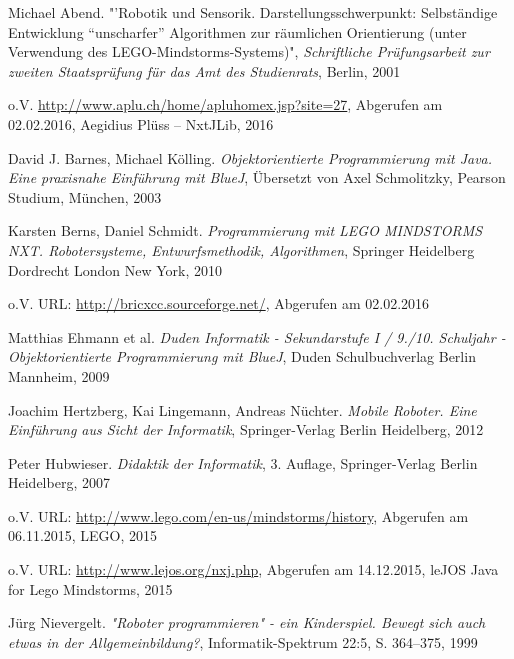 \begin{thebibliography}{ABCDEF}

\renewcommand{\refname}{\normalsize Literaturverzeichnis}

Michael Abend. "'Robotik und Sensorik. Darstellungsschwerpunkt: Selbständige Entwicklung "`unscharfer"' Algorithmen zur räumlichen Orientierung (unter Verwendung des LEGO-Mindstorms-Systems)", \emph{Schriftliche Prüfungsarbeit zur zweiten Staatsprüfung für das Amt des Studienrats}, Berlin, 2001

o.V. \url{http://www.aplu.ch/home/apluhomex.jsp?site=27}, Abgerufen am 02.02.2016, Aegidius Plüss -- NxtJLib, 2016

David J. Barnes, Michael Kölling. \emph{Objektorientierte Programmierung mit Java. Eine praxisnahe Einführung mit BlueJ}, Übersetzt von Axel Schmolitzky, Pearson Studium, München, 2003

Karsten Berns, Daniel Schmidt. \emph{Programmierung mit LEGO MINDSTORMS NXT. Robotersysteme, Entwurfsmethodik, Algorithmen}, Springer Heidelberg Dordrecht London New York, 2010

o.V. URL: \url{http://bricxcc.sourceforge.net/}, Abgerufen am 02.02.2016

Matthias Ehmann et al. \emph{Duden Informatik - Sekundarstufe I / 9./10. Schuljahr - Objektorientierte Programmierung mit BlueJ}, Duden Schulbuchverlag Berlin Mannheim, 2009

Joachim Hertzberg, Kai Lingemann, Andreas Nüchter. \emph{Mobile Roboter. Eine Einführung aus Sicht der Informatik}, Springer-Verlag Berlin Heidelberg, 2012

Peter Hubwieser. \emph{Didaktik der Informatik}, 3. Auflage, Springer-Verlag Berlin Heidelberg, 2007


o.V. URL: \url{http://www.lego.com/en-us/mindstorms/history}, Abgerufen am 06.11.2015, LEGO, 2015

o.V. URL: \url{http://www.lejos.org/nxj.php}, Abgerufen am 14.12.2015, leJOS Java for Lego Mindstorms, 2015

Jürg Nievergelt. \emph{"Roboter programmieren" - ein Kinderspiel. Bewegt sich auch etwas in der Allgemeinbildung?}, Informatik-Spektrum 22:5, S. 364--375, 1999


\end{thebibliography}
